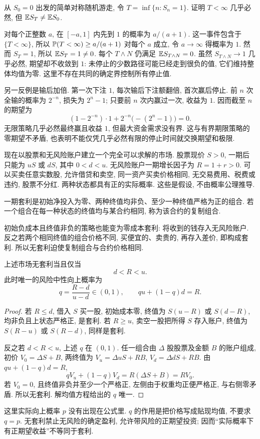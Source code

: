 \begin{example}
从 $S_0=0$ 出发的简单对称随机游走, 令 $T=\inf\{n:S_n=1\}$. 证明 $T<\infty$ 几乎必然, 但 $\mathbb E S_T\ne\mathbb E S_0$.
\end{example}
\begin{solution}
对每个正整数 $a$, 在 $[-a,1]$ 内先到 $1$ 的概率为 $a/(a+1)$. 这一事件包含于 $\{T<\infty\}$, 所以
$\mathbb P(T<\infty)\geq a/(a+1)$ 对每个 $a$ 成立, 令 $a\to\infty$ 得概率为 $1$. 然而 $S_T=1$, 所以 $\mathbb E S_T=1\ne0$.
每个 $T\wedge N$ 仍满足 $\mathbb E S_{T\wedge N}=0$. 虽然
$S_{T\wedge N}\to1$ 几乎必然, 期望却不收敛到 $1$: 未停止的少数路径可能已经走到很负的值, 它们维持整体均值为零. 这里不存在共同的确定界控制所有停止值.
\end{solution}

另一反例是输后加倍. 第一次下注 $1$, 每次输后下注额翻倍, 首次赢后停止. 前 $n$ 次全输的概率为 $2^{-n}$, 损失为 $2^n-1$; 只要前 $n$ 次内赢过一次, 收益为 $1$. 因而截至 $n$ 的期望为
\[
 (1-2^{-n})\cdot1+2^{-n}\bigl(-(2^n-1)\bigr)=0.
\]
无限策略几乎必然最终赢且收益 $1$, 但最大资金需求没有界. 这与有界期限策略的零期望不矛盾, 也表明不能仅凭几乎必然有限的停止时间就交换期望和极限.

现在以股票和无风险账户建立一个完全可以求解的市场. 股票现价 $S>0$, 一期后只能为 $uS$ 或 $dS$, 其中 $0<d<u$. 无风险账户一期增长因子为 $R=1+r>0$. 可以买卖任意实数股, 允许借贷和卖空, 同一资产买卖价格相同, 无交易费用、税费或违约, 股票不分红. 两种状态都具有正的实际概率. 这些是假设, 不由概率公理推导.

\begin{definition}[套利与复制]
一期套利是初始净投入为零、两种终值均非负、至少一种终值严格为正的组合. 若一个组合在每一种状态的终值均与某合约相同, 称为该合约的复制组合.
\end{definition}
初始负成本且终值非负的策略也能变为零成本套利: 将收到的钱存入无风险账户. 反之若两个相同终值的组合价格不同, 买便宜的、卖贵的, 再存入差价, 即构成套利. 所以无套利迫使复制组合与合约价格相同.

\begin{theorem}[一期无套利条件]
上述市场无套利当且仅当
\[
 d<R<u.
\]
此时唯一的风险中性向上概率为
\[
 q=\frac{R-d}{u-d}\in(0,1),\qquad qu+(1-q)d=R.
\]
\end{theorem}
\begin{proof}
若 $R\leq d$, 借入 $S$ 买一股, 初始成本零, 终值为
$S(u-R)$ 或 $S(d-R)$, 均非负且上状态严格正, 是套利.
若 $R\geq u$, 卖空一股把所得 $S$ 存入账户, 终值为
$S(R-u)$ 或 $S(R-d)$, 同样是套利.

反之若 $d<R<u$, 上述 $q$ 在 $(0,1)$. 任一组合由 $\Delta$ 股股票及金额 $B$ 的账户组成, 初价 $V_0=\Delta S+B$, 两终值为
$V_u=\Delta uS+RB$, $V_d=\Delta dS+RB$. 由 $qu+(1-q)d=R$,
\[
 qV_u+(1-q)V_d=R(\Delta S+B)=RV_0.
\]
若 $V_0=0$, 且终值非负并至少一个严格正, 左侧由于权重均正便严格正, 与右侧零矛盾. 所以无套利. 解均值方程给出的 $q$ 唯一.
\end{proof}
这里实际向上概率 $p$ 没有出现在公式里. $q$ 的作用是把价格写成贴现均值, 不要求 $q=p$. 无套利禁止无风险的确定盈利, 允许带风险的正期望投资; 因而“实际概率下有正期望收益”不等同于套利.

